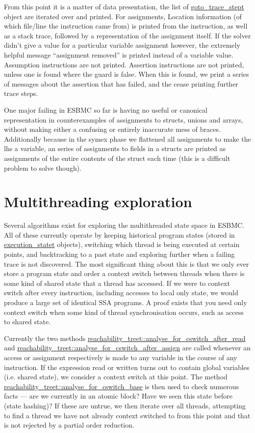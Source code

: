 \documentclass{article}
\begin{document}
From this point it is a matter of data presentation, the list of
\url{goto_trace_stept} object are iterated over and printed. For assignments,
Location information (of which file/line the instruction came from) is printed
from the instruction, as well as a stack trace, followed by a representation
of the assignment itself. If the solver didn't give a value for a particular
variable assignment however, the extremely helpful message ``assignment
removed'' is printed instead of a variable value. Assumption instructions are
not printed. Assertion instructions are not printed, unless one is found where
the guard is false. When this is found, we print a series of messages about
the assertion that has failed, and the cease printing further trace steps.

One major failing in ESBMC so far is having no useful or canonical
representation in counterexamples of assignments to structs, unions and arrays,
without making either a confusing or entirely inaccurate mess of braces.
Additionally because in the symex phase we flattened all assignments to make the
lhs a variable, an series of assignments to fields in a structs are printed
as assignments of the entire contents of the struct each time (this is a
difficult problem to solve though).

\section{Multithreading exploration}

Several algorithms exist for exploring the multithreaded state space in ESBMC.
All of these currently operate by keeping historical program states (stored
in \url{execution_statet} objects), switching
which thread is being executed at certain points, and backtracking to a past
state and exploring further when a failing trace is not discovered. The most
significant thing about this is that we only ever store a program state and
order a context switch between threads when there is some kind of shared
state that a thread has accessed. If we were to context switch after every
instruction, including accesses to local only state, we would produce a large
set of identical SSA programs. A proof exists that you need only context switch
when some kind of thread synchronisation occurs, such as access to shared state.

Currently the two methods
\url{reachability_treet::analyse_for_cswitch_after_read} and
\url{reachability_treet::analyse_for_cswitch_after_assign} are called
whenever an access or assignment respectively is made to any variable in the
course of any instruction. If the expression read or written turns out to
contain global variables (i.e. shared state), we consider a context switch at
this point. The method \url{reachability_treet::analyse_for_cswitch_base} is
then used to check numerous facts --- are we currently in an atomic block?
Have we seen this state before (state hashing)? If these are untrue, we then
iterate over all threads, attempting to find a thread we have not already
context switched to from this point and that is not rejected by a partial
order reduction.
\end{document}
